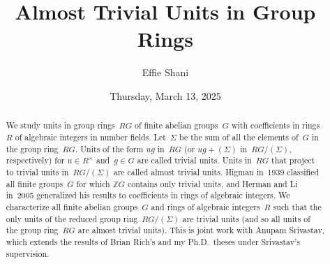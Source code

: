 \documentclass{UAmathtalk}
\author{Effie Shani}
\title{Almost Trivial Units in Group Rings}
\date{Thursday, March 13, 2025}
\begin{document}
\maketitle

\begin{abstract}
We study units in group rings~$RG$ of finite abelian groups~$G$ with coefficients in rings~$R$ of algebraic integers in number fields.
Let~$\Sigma$ be the sum of all the elements of~$G$ in the group ring~$RG$.
Units of the form $ug$ in~$RG$ (or $ug+(\Sigma)$ in~$RG/(\Sigma)$, respectively) for $u\in R^\times$ and~$g\in G$ are called trivial units.
Units in~$RG$ that project to trivial units in~$RG/(\Sigma)$ are called almost trivial units.
Higman in~1939 classified all finite groups~$G$ for which $\mathbb{Z}G$ contains only trivial units, and Herman and Li in~2005 generalized his results to coefficients in rings of algebraic integers.
We characterize all finite abelian groups~$G$ and rings of algebraic integers~$R$ such that the only units of the reduced group ring~$RG/(\Sigma)$ are trivial units (and so all units of the group ring~$RG$ are almost trivial units).
This is joint work with Anupam Srivastav, which extends the results of Brian Rich’s and my Ph.D.\ theses under Srivastav’s supervision.
\end{abstract}
\end{document}
